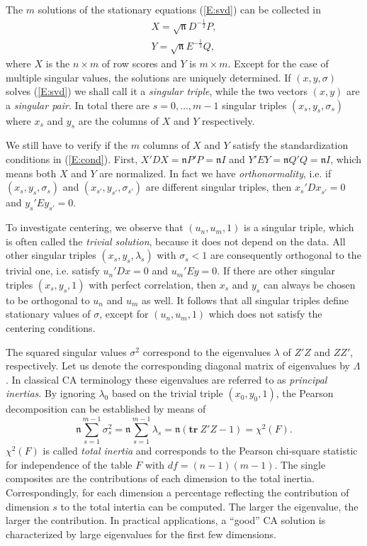 \documentclass[article]{Z}
\begin{document}
The \(m\) solutions of the stationary equations (\ref{E:svd}) can be collected in 
\begin{subequations}\label{E:rcscores}
\begin{align}
X=\sqrt{\mathfrak{n}}D^{-\frac12}P, \\
Y=\sqrt{\mathfrak{n}}E^{-\frac12}Q,
\end{align}
\end{subequations}
where $X$ is the $n \times m$ of row scores and $Y$ is $m \times m$. Except for the case of multiple singular values, the solutions are uniquely determined. If \((x,y,\sigma)\) solves (\ref{E:svd}) we shall call it a \emph{singular triple},
while the two vectors \((x,y)\) are a \emph{singular pair}. In total there are $s=0,\ldots,m-1$ singular triples $(x_s,y_s,\sigma_s)$ where $x_s$ and $y_s$ are the columns of $X$ and $Y$ respectively. 

We still have to verify if the \(m\) columns of \(X\) and \(Y\) satisfy the standardization conditions in (\ref{E:cond}). First, \(X'DX=\mathfrak{n}P'P=\mathfrak{n}I\) and \(Y'EY=\mathfrak{n}Q'Q=\mathfrak{n}I\), which means both \(X\) and \(Y\) are normalized. In fact we have \emph{orthonormality}, i.e. if \((x_s,y_s,\sigma_s)\) and \((x_{s'},y_{s'},\sigma_{s'})\) are different singular triples, then \(x_s'Dx_{s'}^{}=0\) and \(y_s'Ey_{s'}^{}=0\).
 
To investigate centering, we observe that \((u_n,u_m,1)\) is a singular triple, which is often called the \emph{trivial solution}, because it does not depend on the data. All other singular triples \((x_s,y_s,\lambda_s)\)
with \(\sigma_s<1\) are consequently orthogonal to the trivial one, i.e. satisfy \(u_n'Dx=0\) and \(u_m'Ey=0\). If there are other singular triples \((x_s,y_s,1)\) with perfect correlation, then \(x_s\) and \(y_s\) can always be chosen to be orthogonal to \(u_n\) and \(u_m\) as well. It follows that all singular triples define stationary values of \(\sigma\), except for \((u_n,u_m,1)\) which does not satisfy the centering conditions.

The squared singular values $\sigma^2$ correspond to the eigenvalues $\lambda$ of $Z'Z$ and $ZZ'$, respectively. Let us denote the corresponding diagonal matrix of eigenvalues by $\Lambda$. In classical CA terminology \citep[see e.g.][]{Greenacre:84} these eigenvalues are referred to as \emph{principal inertias}. By ignoring $\lambda_0$ based on the trivial triple $(x_0,y_0,1)$, the Pearson decomposition can be established by means of
\begin{equation}\label{E:pear}
\mathfrak{n}\sum_{s=1}^{m-1}\sigma_s^2=\mathfrak{n}\sum_{s=1}^{m-1}\lambda_s=\mathfrak{n}(\mathbf{tr}\ Z'Z-1)=\chi^2(F).
\end{equation}
$\chi^2(F)$ is called \emph{total inertia} and corresponds to the Pearson chi-square statistic for independence of the table $F$ with $df = (n-1)(m-1)$. The single composites are the contributions of each dimension to the total inertia. Correspondingly, for each dimension a percentage reflecting the contribution of dimension $s$ to the total intertia can be computed. The larger the eigenvalue, the larger the contribution. In practical applications, a ``good'' CA solution is characterized by large eigenvalues for the first few dimensions. 
\end{document}
